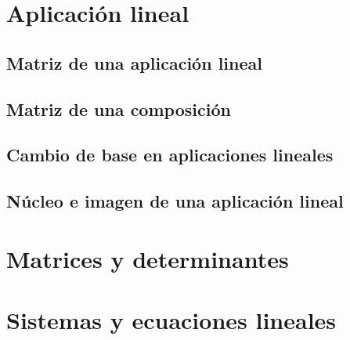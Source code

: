 \documentclass[0_algebra.tex]{subfiles}
\begin{document}
\begin{figure}[h]
	\centering
	
\end{figure}

\section{Aplicación lineal}

\begin{figure}[h]
	\centering
	
\end{figure}

\subsection{Matriz de una aplicación lineal}
\begin{figure}[h]
	\centering
	
\end{figure}
\subsection{Matriz de una composición}
\begin{figure}[h]
	\centering
	
\end{figure}
\subsection{Cambio de base en aplicaciones lineales}
\begin{figure}[h]
	\centering
	
\end{figure}
\subsection{Núcleo e imagen de una aplicación lineal}
\begin{figure}[h]
	\centering
	
\end{figure}

\section{Matrices y determinantes}
\begin{figure}[h]
	\centering
	
\end{figure}

\section{Sistemas y ecuaciones lineales}
\begin{figure}[h]
	\centering
	
\end{figure}
\end{document}
